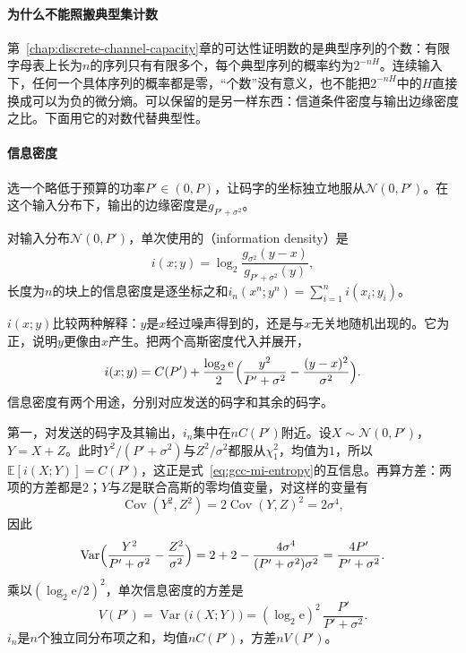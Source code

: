 \paragraph{为什么不能照搬典型集计数}
第~\ref{chap:discrete-channel-capacity}章的可达性证明数的是典型序列的个数：有限字母表上长为$n$的序列只有有限多个，每个典型序列的概率约为$2^{-nH}$。连续输入下，任何一个具体序列的概率都是零，“个数”没有意义，也不能把$2^{-nH}$中的$H$直接换成可以为负的微分熵。可以保留的是另一样东西：信道条件密度与输出边缘密度之比。下面用它的对数代替典型性。

\paragraph{信息密度}
选一个略低于预算的功率$P'\in(0,P)$，让码字的坐标独立地服从$\mathcal{N}(0,P')$。在这个输入分布下，输出的边缘密度是$g_{P'+\sigma^2}$。

\begin{definition}[信息密度]
\label{def:gcc-info-density}
对输入分布$\mathcal{N}(0,P')$，单次使用的（information density）是
\begin{equation}
 i(x;y)=\log_2\frac{g_{\sigma^2}(y-x)}{g_{P'+\sigma^2}(y)} ,
 \label{eq:gcc-info-density}
\end{equation}
长度为$n$的块上的信息密度是逐坐标之和$i_n(x^n;y^n)=\sum_{i=1}^{n}i(x_i;y_i)$。
\end{definition}

$i(x;y)$比较两种解释：$y$是$x$经过噪声得到的，还是与$x$无关地随机出现的。它为正，说明$y$更像由$x$产生。把两个高斯密度代入并展开，
\begin{equation}
 i(x;y)=C(P')+\frac{\log_2\mathrm{e}}{2}\Bigl(\frac{y^2}{P'+\sigma^2}-\frac{(y-x)^2}{\sigma^2}\Bigr) .
 \label{eq:gcc-info-density-explicit}
\end{equation}
信息密度有两个用途，分别对应发送的码字和其余的码字。

第一，对发送的码字及其输出，$i_n$集中在$nC(P')$附近。设$X\sim\mathcal{N}(0,P')$，$Y=X+Z$。此时$Y^2/(P'+\sigma^2)$与$Z^2/\sigma^2$都服从$\chi^2_1$，均值为$1$，所以$\mathbb{E}[i(X;Y)]=C(P')$，这正是式~\eqref{eq:gcc-mi-entropy}的互信息。再算方差：两项的方差都是$2$；$Y$与$Z$是联合高斯的零均值变量，对这样的变量有
\[
 \operatorname{Cov}(Y^2,Z^2)=2\operatorname{Cov}(Y,Z)^2=2\sigma^4 ,
\]
因此
\[
 \operatorname{Var}\Bigl(\frac{Y^2}{P'+\sigma^2}-\frac{Z^2}{\sigma^2}\Bigr)=2+2-\frac{4\sigma^4}{(P'+\sigma^2)\sigma^2}=\frac{4P'}{P'+\sigma^2} .
\]
乘以$(\log_2\mathrm{e}/2)^2$，单次信息密度的方差是
\begin{equation}
 V(P')=\operatorname{Var}\bigl(i(X;Y)\bigr)=(\log_2\mathrm{e})^2\,\frac{P'}{P'+\sigma^2} .
 \label{eq:gcc-info-variance}
\end{equation}
$i_n$是$n$个独立同分布项之和，均值$nC(P')$，方差$nV(P')$。

